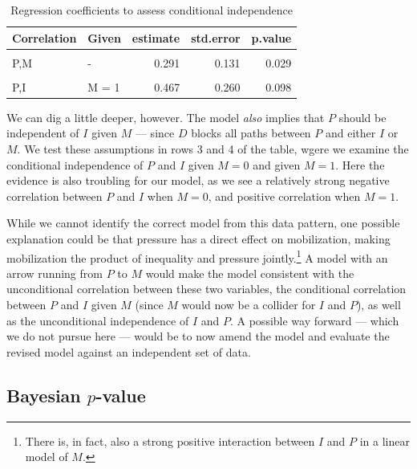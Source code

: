 \documentclass[
  12pt,
]{book}
\begin{document}
\begin{table}

\caption{\label{tab:ch15cipimd}Regression coefficients to assess conditional independence}
\centering
\begin{tabular}[t]{llrrr}
\toprule
Correlation & Given & estimate & std.error & p.value\\
\midrule
\cellcolor{gray!6}{P,I} & \cellcolor{gray!6}{-} & \cellcolor{gray!6}{0.000} & \cellcolor{gray!6}{0.114} & \cellcolor{gray!6}{1.000}\\
P,M & - & 0.291 & 0.131 & 0.029\\
\cellcolor{gray!6}{P,I} & \cellcolor{gray!6}{M = 0} & \cellcolor{gray!6}{-0.220} & \cellcolor{gray!6}{0.111} & \cellcolor{gray!6}{0.053}\\
P,I & M = 1 & 0.467 & 0.260 & 0.098\\
\bottomrule
\end{tabular}
\end{table}

We can dig a little deeper, however. The model \emph{also} implies that \(P\) should be independent of \(I\) given \(M\) --- since \(D\) blocks all paths between \(P\) and either \(I\) or \(M\). We test these assumptions in rows 3 and 4 of the table, wgere we examine the conditional independence of \(P\) and \(I\) given \(M=0\) and given \(M=1\). Here the evidence is also troubling for our model, as we see a relatively strong negative correlation between \(P\) and \(I\) when \(M=0\), and positive correlation when \(M=1\).

While we cannot identify the correct model from this data pattern, one possible explanation could be that pressure has a direct effect on mobilization, making mobilization the product of inequality and pressure jointly.\footnote{There is, in fact, also a strong positive interaction between \(I\) and \(P\) in a linear model of \(M\).} A model with an arrow running from \(P\) to \(M\) would make the model consistent with the unconditional correlation between these two variables, the conditional correlation between \(P\) and \(I\) given \(M\) (since \(M\) would now be a collider for \(I\) and \(P\)), as well as the unconditional independence of \(I\) and \(P\). A possible way forward --- which we do not pursue here --- would be to now amend the model and evaluate the revised model against an independent set of data.

\hypertarget{bayesian-p-value}{%
\subsection{\texorpdfstring{Bayesian \(p\)-value}{Bayesian p-value}}\label{bayesian-p-value}}
\end{document}

